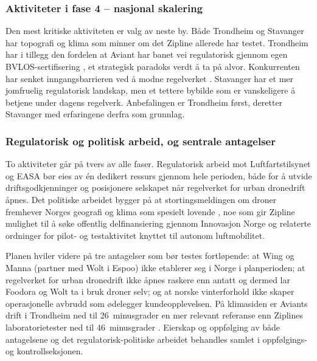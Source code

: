 \subsubsection{Aktiviteter i fase 4 -- nasjonal skalering}

Den mest kritiske aktiviteten er valg av neste by. Både Trondheim og
Stavanger har topografi og klima som minner om det Zipline allerede har
testet. Trondheim har i tillegg den fordelen at Aviant har banet vei
regulatorisk gjennom egen BVLOS-sertifisering
\parencite{aviant2024}, et strategisk paradoks verdt å ta på alvor.
Konkurrenten har senket inngangsbarrieren ved å modne regelverket
\parencite{porter1980}. Stavanger har et mer jomfruelig regulatorisk
landskap, men et tettere bybilde som er vanskeligere å betjene under
dagens regelverk. Anbefalingen er Trondheim først, deretter Stavanger med
erfaringene derfra som grunnlag.

\subsubsection{Regulatorisk og politisk arbeid, og sentrale antagelser}

To aktiviteter går på tvers av alle faser. Regulatorisk arbeid mot
Luftfartstilsynet og EASA
\parencite{luftfartstilsynet2023, euuas2021} bør eies av én dedikert
ressurs gjennom hele perioden, både for å utvide driftsgodkjenninger og
posisjonere selskapet når regelverket for urban dronedrift åpnes. Det
politiske arbeidet bygger på at stortingsmeldingen om droner fremhever
Norges geografi og klima som spesielt lovende
\parencite{stortingsmelding2025}, noe som gir Zipline mulighet til å søke
offentlig delfinansiering gjennom Innovasjon Norge og relaterte
ordninger for pilot- og testaktivitet knyttet til autonom luftmobilitet.

Planen hviler videre på tre antagelser som bør testes fortløpende: at
Wing \parencite{wing2024} og Manna (partner med Wolt i Espoo) ikke
etablerer seg i Norge i planperioden; at regelverket for urban dronedrift
ikke åpnes raskere enn antatt og dermed lar Foodora og Wolt ta i bruk
droner selv; og at norske vinterforhold ikke skaper operasjonelle avbrudd
som ødelegger kundeopplevelsen. På klimasiden er Aviants drift i Trondheim
ned til 26~minusgrader en mer relevant referanse enn Ziplines
laboratorietester ned til 46~minusgrader \parencite{dronexl2026}. Eierskap
og oppfølging av både antagelsene og det regulatorisk-politiske arbeidet
behandles samlet i oppfølgings- og kontrollseksjonen.
